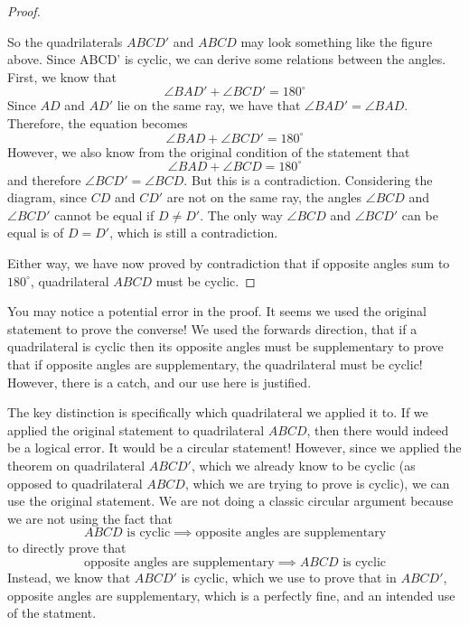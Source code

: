 \begin{proof}
\begin{center}
\end{center}
So the quadrilaterals $ABCD'$ and $ABCD$ may look something like the figure above. Since ABCD' is cyclic, we can derive some relations between the angles. First, we know that 
\[
\angle BAD' + \angle BCD' = 180^\circ
\]
Since $AD$ and $AD'$ lie on the same ray, we have that $\angle BAD' = \angle BAD$. Therefore, the equation becomes
\[
\angle BAD + \angle BCD' = 180^\circ
\]
However, we also know from the original condition of the statement that
\[
\angle BAD + \angle BCD = 180^\circ
\]
and therefore $\angle BCD' = \angle BCD$. But this is a contradiction. Considering the diagram, since $CD$ and $CD'$ are not on the same ray, the angles $\angle BCD$ and $\angle BCD'$ cannot be equal if $D \neq D'$. The only way $\angle BCD$ and $\angle BCD'$ can be equal is of $D = D'$, which is still a contradiction. 

Either way, we have now proved by contradiction that if opposite angles sum to $180^\circ$, quadrilateral $ABCD$ must be cyclic. 
\end{proof}

You may notice a potential error in the proof. It seems we used the original statement to prove the converse! We used the forwards direction, that if a quadrilateral is cyclic then its opposite angles must be supplementary to prove that if opposite angles are supplementary, the quadrilateral must be cyclic! However, there is a catch, and our use here is justified. 

The key distinction is specifically which quadrilateral we applied it to. If we applied the original statement to quadrilateral $ABCD$, then there would indeed be a logical error. It would be a circular statement! However, since we applied the theorem on quadrilateral $ABCD'$, which we already know to be cyclic (as opposed to quadrilateral $ABCD$, which we are trying to prove is cyclic), we can use the original statement. We are not doing a classic circular argument because we are not using the fact that 
\[
\text{$ABCD$ is cyclic} \implies \text{opposite angles are supplementary}
\]
to directly prove that 
\[
\text{opposite angles are supplementary}\implies \text{$ABCD$ is cyclic} 
\]
Instead, we know that $ABCD'$ is cyclic, which we use to prove that in $ABCD'$, opposite angles are supplementary, which is a perfectly fine, and an intended use of the statment. 

